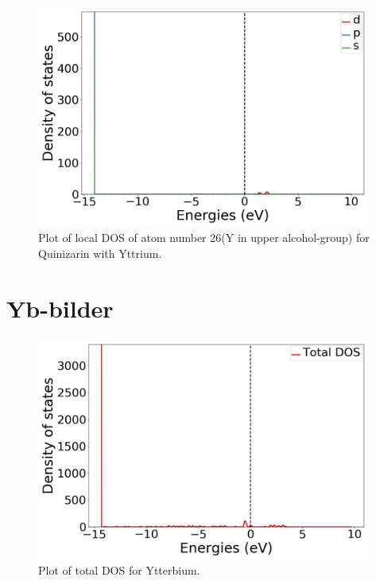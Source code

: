 \documentclass{article}
\begin{document}
  \begin{figure}[H]
      \centering
      \includegraphics[width = 11cm]{../fig/Y_LDOS26_1.png}
      \caption{Plot of local DOS of atom number 26(Y in upper alcohol-group) for Quinizarin with Yttrium. }
      \label{fig:Y_LDOS26_1}
  \end{figure}

\vspace{1cm}

\section{Yb-bilder}

  \begin{figure}[H]
      \centering
      \includegraphics[width = 11cm]{../fig/Yb_TDOS_1.png}
      \caption{Plot of total DOS for Ytterbium. }
      \label{fig:Yb_TDOS_1}
  \end{figure}
\end{document}

